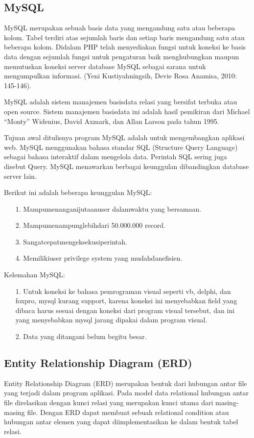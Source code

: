 \documentclass{jtetiproposalskripsi}
\begin{document}
\subsection{MySQL}
MySQL merupakan sebuah basis data yang mengandung satu atau beberapa kolom. Tabel terdiri atas sejumlah baris dan setiap baris mengandung satu atau beberapa kolom. Didalam PHP telah menyediakan fungsi untuk koneksi ke basis data dengan sejumlah fungsi untuk pengaturan baik menghubungkan maupun memutuskan koneksi server database MySQL sebagai sarana untuk mengumpulkan informasi. (Yeni Kustiyahningsih, Devie Rosa Anamisa, 2010: 145-146).

MySQL adalah sistem manajemen basisdata relasi yang bersifat terbuka atau open source. Sistem manajemen basisdata ini adalah hasil pemikiran dari Michael “Monty” Widenius, David Axmark, dan Allan Larson pada tahun 1995. 

Tujuan awal ditulisnya program MySQL adalah untuk mengembangkan aplikasi web. MySQL menggunakan bahasa standar SQL (Structure Query Language) sebagai bahasa interaktif dalam mengelola data. 
Perintah SQL sering juga disebut Query. MySQL menawarkan berbagai keunggulan dibandingkan database server lain.

Berikut ini adalah beberapa keunggulan MySQL:
\begin{itemize}

\item[1.]	Mampumenanganijutaanuser dalamwaktu yang bersamaan.
\item[2.]	Mampumenampunglebihdari 50.000.000 record.
\item[3.]	Sangatcepatmengeksekusiperintah.
\item[4.]	Memilikiuser privilege system yang mudahdanefisien.
\end{itemize}

Kelemahan MySQL:
\begin{itemize}

\item[1.]	Untuk koneksi ke bahasa pemrograman visual seperti vb, delphi, dan foxpro, mysql kurang support, karena koneksi ini menyebabkan field yang dibaca harus sesuai dengan koneksi dari program visual tersebut, dan ini yang menyebabkan mysql jarang dipakai dalam program visual.
\item[2.]	Data yang ditangani belum begitu besar.
\end{itemize}

\subsection{Entity Relationship Diagram (ERD)}
Entity Relationship Diagram (ERD) merupakan bentuk dari hubungan antar file yang terjadi dalam program aplikasi. Pada model data relational hubungan antar file direlasikan dengan kunci relasi yang merupakan kunci utama dari masing-masing file. Dengan ERD dapat membuat sebuah relational condition atau hubungan antar elemen yang dapat diimplementasikan ke dalam bentuk tabel relasi.
\end{document}
